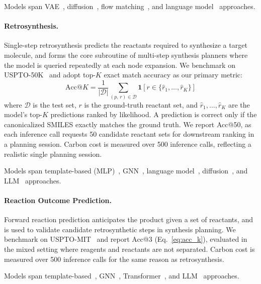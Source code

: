 \documentclass{article}
\theoremstyle{plain}
\theoremstyle{definition}
\theoremstyle{remark}
\begin{document}
Models span VAE~\cite{xie2021crystal}, diffusion~\cite{jiao2023crystal, zeni2025generative}, flow matching~\cite{miller2024flowmm}, and language model~\cite{antunes2024crystal} approaches.

\paragraph{Retrosynthesis.}
Single-step retrosynthesis predicts the reactants required to synthesize a target molecule, and forms the core subroutine of multi-step synthesis planners where the model is queried repeatedly at each node expansion. We benchmark on USPTO-50K~\cite{schneider2016s} and adopt top-$K$ exact match accuracy as our primary metric:
\begin{equation}
    \text{Acc}@K = \frac{1}{|\mathcal{D}|} \sum_{(p,\, r) \in \mathcal{D}} 
    \mathbf{1}\!\left[ r \in \{\hat{r}_1, \dots, \hat{r}_K\} \right]
    \label{eq:acc_k}
\end{equation}
where $\mathcal{D}$ is the test set, $r$ is the ground-truth reactant set, and $\hat{r}_1, \dots, \hat{r}_K$ are the model's top-$K$ predictions ranked by likelihood. A prediction is correct only if the canonicalized SMILES exactly matches the ground truth. We report Acc@50, as each inference call requests 50 candidate reactant sets for downstream ranking in a planning session. Carbon cost is measured over 500 inference calls, reflecting a realistic single planning session. 

Models span template-based (MLP)~\cite{segler2017neural}, GNN~\cite{megan2021jcim, chen2021deep}, language model~\cite{irwin2022chemformer, zhong2022root}, diffusion~\cite{igashov2023retrobridge}, and LLM~\cite{yu2024llasmol, deng2025rsgpt} approaches.

\paragraph{Reaction Outcome Prediction.}
Forward reaction prediction anticipates the product given a set of reactants, and is used to validate candidate retrosynthetic steps in synthesis planning. We benchmark on USPTO-MIT~\cite{jin2017predicting} and report Acc@3 (Eq.~\ref{eq:acc_k}), evaluated in the mixed setting where reagents and reactants are not separated. Carbon cost is measured over 500 inference calls for the same reason as retrosynthesis. 

Models span template-based~\cite{segler2017neural}, GNN~\cite{megan2021jcim, chen2022generalized}, Transformer~\cite{schwaller2019molecular, zhong2022root, tu2022permutation}, and LLM~\cite{yu2024llasmol} approaches.
\end{document}
